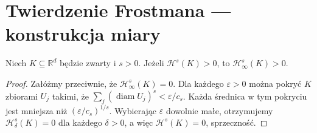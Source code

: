 \section{Twierdzenie Frostmana — konstrukcja miary}
\begin{lemat}
\label{lem:positive-content-26}
Niech $K\subseteq\mathbb R^d$ będzie zwarty i $s>0$.
Jeżeli $\mathcal H^s(K)>0$, to
$\mathcal H^s_\infty(K)>0$.
\end{lemat}
\begin{proof}
Załóżmy przeciwnie, że $\mathcal H^s_\infty(K)=0$.
Dla każdego $\varepsilon>0$ można pokryć $K$
zbiorami $U_j$ takimi, że
$\sum_j(\operatorname{diam}U_j)^s<\varepsilon/c_s$.
Każda średnica w tym pokryciu jest mniejsza niż
$(\varepsilon/c_s)^{1/s}$. Wybierając
$\varepsilon$ dowolnie małe, otrzymujemy
$\mathcal H^s_\delta(K)=0$ dla każdego $\delta>0$,
a więc $\mathcal H^s(K)=0$, sprzeczność.
\end{proof}

